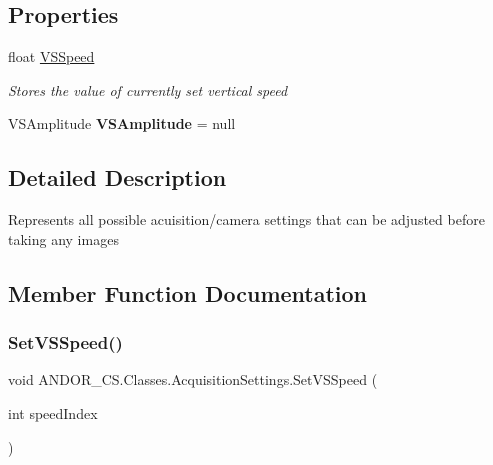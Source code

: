 \subsection*{Properties}
\begin{DoxyCompactItemize}
\item 
float \hyperlink{class_a_n_d_o_r___c_s_1_1_classes_1_1_acquisition_settings_a8c28fef4f4d906792f085d9f291648a1}{V\+S\+Speed}
\begin{DoxyCompactList}\small\item\em Stores the value of currently set vertical speed \end{DoxyCompactList}\item 
\mbox{\label{class_a_n_d_o_r___c_s_1_1_classes_1_1_acquisition_settings_a314f40f5f317184e063a685964943357}} 
V\+S\+Amplitude {\bfseries V\+S\+Amplitude} = null
\end{DoxyCompactItemize}


\subsection{Detailed Description}
Represents all possible acuisition/camera settings that can be adjusted before taking any images 



\subsection{Member Function Documentation}
\mbox{\label{class_a_n_d_o_r___c_s_1_1_classes_1_1_acquisition_settings_a88ab97b728c2aff52ddc829a89361338}} 
\subsubsection{\texorpdfstring{Set\+V\+S\+Speed()}{SetVSSpeed()}\hspace{0.1cm}{\footnotesize\ttfamily [1/2]}}
{\footnotesize\ttfamily void A\+N\+D\+O\+R\+\_\+\+C\+S.\+Classes.\+Acquisition\+Settings.\+Set\+V\+S\+Speed (\begin{DoxyParamCaption}\item[{int}]{speed\+Index }\end{DoxyParamCaption})}




